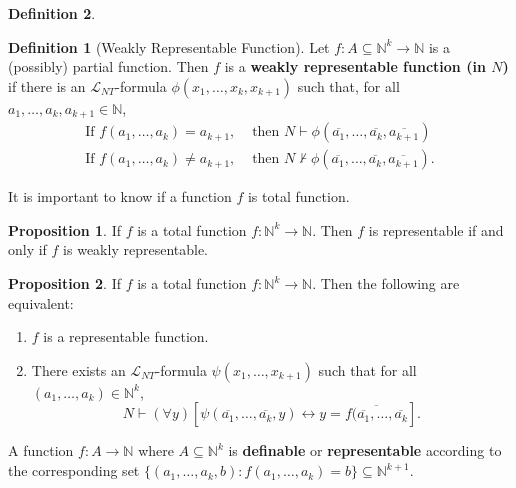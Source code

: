 \documentclass[11pt,letterpaper]{book}
\theoremstyle{definition}
\newtheorem{definition}{Definition}[section]
\newtheorem{proposition}{Proposition}[section]
\begin{document}
\begin{definition}
{\begin{definition}[Weakly Representable Function]
Let $f: A \subseteq \mathbb{N}^k \rightarrow \mathbb{N}$ is a (possibly)
partial function. Then $f$ is a \textbf{weakly representable function
(in $N$)} if there is an $\mathcal{L}_{NT}$-formula $\phi( x_1, \ldots,
x_{k}, x_{k+1} )$ such that, for all $a_1, \ldots, a_k, a_{k+1} \in
\mathbb{N}$,
\begin{equation}
\begin{array}{ll}
\text{If } f(a_1, \ldots, a_k) = a_{k+1}, & \text{ then } N \vdash
\phi(\overline{a_1},  \ldots, \overline{a_k},\overline{a_{k+1}}) \\
\text{If } f(a_1, \ldots, a_k) \neq a_{k+1}, & \text{ then } N \not
\vdash \phi(\overline{a_1},  \ldots, \overline{a_k}, \overline{a_{k+1}}).
\end{array}\nonumber
\end{equation}
\end{definition}

It is important to know if a function $f$ is total function.

\begin{proposition}\label{proposition:total_func_representable_weakly_representable}
If $f$ is a total function $f: \mathbb{N}^k \rightarrow \mathbb{N}$.
Then $f$ is representable if and only if $f$ is weakly representable.
\end{proposition}


\begin{proposition}
If $f$ is a total function $f: \mathbb{N}^k \rightarrow \mathbb{N}$.
Then the following are equivalent:
\begin{enumerate}
\item{$f$ is a representable function.}
\item{There exists an $\mathcal{L}_{NT}$-formula $\psi (x_1, \ldots,
x_{k+1})$ such that for all $(a_1, \ldots, a_k) \in \mathbb{N}^k$, $$ N \vdash
(\forall y) [ \psi(\overline{a_1 }, \ldots, \overline{a_k}, y) \leftrightarrow y =
\overline{f(\overline{a_1 }, \ldots, \overline{a_k}} ] .$$ }
\end{enumerate}

\end{proposition}
}
A function $f : A \rightarrow \mathbb{N}$ where $A \subseteq \mathbb{N}^k$ is \textbf{definable} or \textbf{representable} according to the corresponding set $ \{ (a_1, \ldots, a_k, b) : f(a_1, \ldots, a_k) = b \} \subseteq\mathbb{N}^{k+1} $.

\end{definition}
\end{document}
